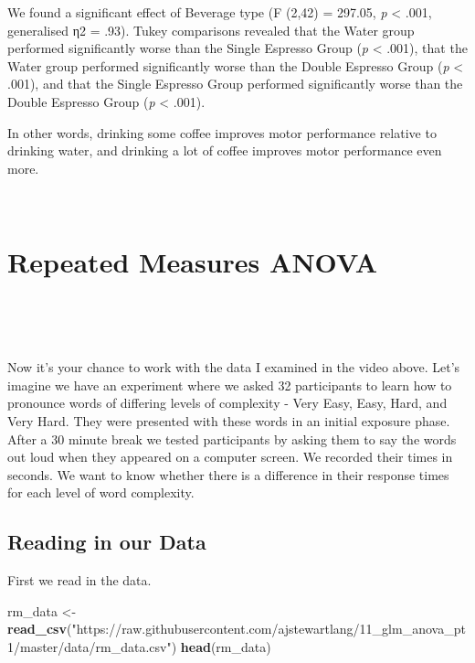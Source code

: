 \documentclass[
]{book}
\newenvironment{Shaded}{\begin{snugshade}}{\end{snugshade}}
\newcommand{\FunctionTok}[1]{\textcolor[rgb]{0.13,0.29,0.53}{\textbf{#1}}}
\newcommand{\NormalTok}[1]{#1}
\newcommand{\OtherTok}[1]{\textcolor[rgb]{0.56,0.35,0.01}{#1}}
\newcommand{\StringTok}[1]{\textcolor[rgb]{0.31,0.60,0.02}{#1}}
\begin{document}
We found a significant effect of Beverage type (F (2,42) = 297.05, \emph{p} \textless{} .001, generalised η2 = .93). Tukey comparisons revealed that the Water group performed significantly worse than the Single Espresso Group (\emph{p} \textless{} .001), that the Water group performed significantly worse than the Double Espresso Group (\emph{p} \textless{} .001), and that the Single Espresso Group performed significantly worse than the Double Espresso Group (\emph{p} \textless{} .001).

In other words, drinking some coffee improves motor performance relative to drinking water, and drinking a lot of coffee improves motor performance even more.

~~

\hypertarget{repeated-measures-anova}{%
\section{Repeated Measures ANOVA}\label{repeated-measures-anova}}

~~

~~

Now it's your chance to work with the data I examined in the video above. Let's imagine we have an experiment where we asked 32 participants to learn how to pronounce words of differing levels of complexity - Very Easy, Easy, Hard, and Very Hard. They were presented with these words in an initial exposure phase. After a 30 minute break we tested participants by asking them to say the words out loud when they appeared on a computer screen. We recorded their times in seconds. We want to know whether there is a difference in their response times for each level of word complexity.

\hypertarget{reading-in-our-data-1}{%
\subsection{Reading in our Data}\label{reading-in-our-data-1}}

First we read in the data.

\begin{Shaded}
\begin{Highlighting}[]
\NormalTok{rm\_data }\OtherTok{\textless{}{-}} \FunctionTok{read\_csv}\NormalTok{(}\StringTok{"https://raw.githubusercontent.com/ajstewartlang/11\_glm\_anova\_pt1/master/data/rm\_data.csv"}\NormalTok{)}
\FunctionTok{head}\NormalTok{(rm\_data)}
\end{Highlighting}
\end{Shaded}
\end{document}
